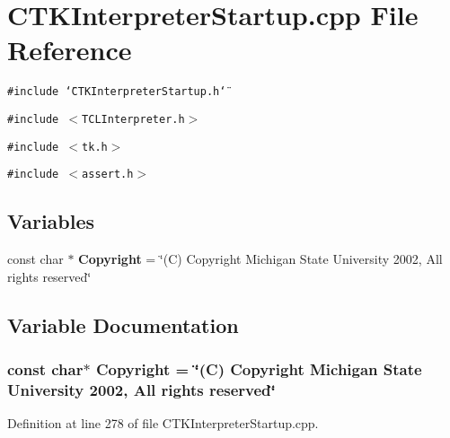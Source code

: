 \section{CTKInterpreter\-Startup.cpp File Reference}
\label{CTKInterpreterStartup_8cpp}
{\tt \#include \char`\"{}CTKInterpreter\-Startup.h\char`\"{}}\par
{\tt \#include $<$TCLInterpreter.h$>$}\par
{\tt \#include $<$tk.h$>$}\par
{\tt \#include $<$assert.h$>$}\par
\subsection*{Variables}
\begin{CompactItemize}
\item 
const char $\ast$ {\bf Copyright} = \char`\"{}(C) Copyright Michigan State University 2002, All rights reserved\char`\"{}
\end{CompactItemize}


\subsection{Variable Documentation}
\subsubsection{\setlength{\rightskip}{0pt plus 5cm}const char$\ast$ Copyright = \char`\"{}(C) Copyright Michigan State University 2002, All rights reserved\char`\"{}\hspace{0.3cm}{\tt  [static]}}\label{CTKInterpreterStartup_8cpp_a0}




Definition at line 278 of file CTKInterpreter\-Startup.cpp.